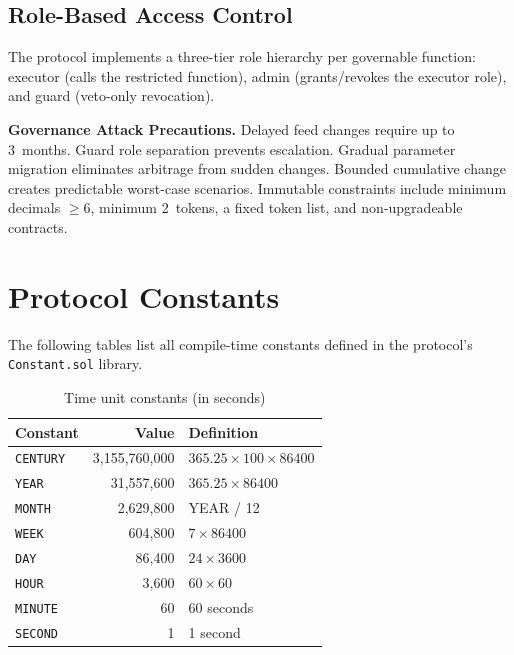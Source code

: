 \documentclass[10pt,a4paper,twocolumn]{article}
\begin{document}
\subsection{Role-Based Access Control}

The protocol implements a three-tier role hierarchy per governable function: executor (calls the restricted function), admin (grants/revokes the executor role), and guard (veto-only revocation).

\textbf{Governance Attack Precautions.} Delayed feed changes require up to 3~months. Guard role separation prevents escalation. Gradual parameter migration eliminates arbitrage from sudden changes. Bounded cumulative change creates predictable worst-case scenarios. Immutable constraints include minimum decimals $\geq 6$, minimum 2~tokens, a fixed token list, and non-upgradeable contracts.

\section{Protocol Constants}
\label{apx:constants}

The following tables list all compile-time constants defined in the protocol's \texttt{Constant.sol} library.

\begin{table}[H]
\centering
\caption{Time unit constants (in seconds)}
\label{tab:time-constants}
\small
\begin{tabularx}{0.95\columnwidth}{@{}l r X@{}}
\toprule
Constant & Value & Definition \\
\midrule
\texttt{CENTURY} & 3,155,760,000 & $365.25 \times 100 \times 86400$ \\
\texttt{YEAR} & 31,557,600 & $365.25 \times 86400$ \\
\texttt{MONTH} & 2,629,800 & YEAR / 12 \\
\texttt{WEEK} & 604,800 & $7 \times 86400$ \\
\texttt{DAY} & 86,400 & $24 \times 3600$ \\
\texttt{HOUR} & 3,600 & $60 \times 60$ \\
\texttt{MINUTE} & 60 & 60 seconds \\
\texttt{SECOND} & 1 & 1 second \\
\bottomrule
\end{tabularx}
\end{table}
\end{document}
